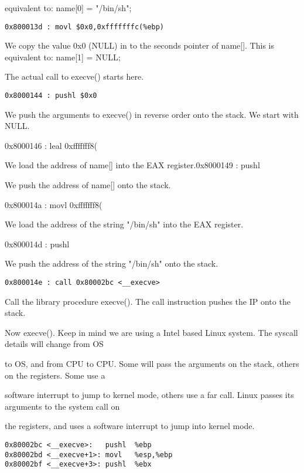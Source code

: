 \documentclass[10pt]{article}
\begin{document}
equivalent to: name[0] = "/bin/sh";

\begin{lstlisting}
0x800013d : movl $0x0,0xfffffffc(%ebp)
\end{lstlisting}

We copy the value 0x0 (NULL) in to the seconds pointer of name[].  This is equivalent to: name[1] = NULL; 

The actual call to execve() starts here.

\begin{lstlisting}
0x8000144 : pushl $0x0
\end{lstlisting}

We push the arguments to execve() in reverse order onto the stack. We start with NULL.

0x8000146 : leal 0xfffffff8(%

We load the address of name[] into the EAX register.0x8000149 : pushl %

We push the address of name[]  onto the stack.

0x800014a : movl 0xfffffff8(%

We load the address of the string "/bin/sh" into the EAX register.

0x800014d : pushl %

We push the address of the string "/bin/sh" onto the stack.

\begin{lstlisting}
0x800014e : call 0x80002bc <__execve>
\end{lstlisting}

Call the library procedure execve(). The call instruction pushes the IP onto the stack.

Now execve(). Keep in mind we are using a Intel based Linux system. The syscall details will change from OS 

to OS, and from CPU to CPU. Some will pass the arguments on the stack, others on the registers. Some use a 

software interrupt to jump to kernel mode, others use a far call. Linux passes its arguments to the system call on 

the registers, and uses a software interrupt to jump into kernel mode.

\begin{lstlisting}
0x80002bc <__execve>:   pushl  %ebp
0x80002bd <__execve+1>: movl   %esp,%ebp
0x80002bf <__execve+3>: pushl  %ebx
\end{lstlisting}
\end{document}
